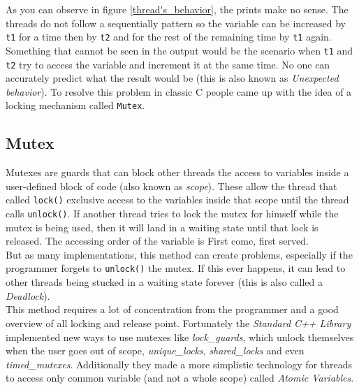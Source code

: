 As you can observe in figure \ref{thread's_behavior}, the prints make no sense. The threads do not follow a sequentially pattern so the variable can be increased by \texttt{t1} for a time then by \texttt{t2} and for the rest of the remaining time by \texttt{t1} again.\\
Something that cannot be seen in the output would be the scenario when \texttt{t1} and \texttt{t2} try to access the variable and increment it at the same time. No one can accurately predict what the result would be (this is also known as \textit{ Unexpected behavior}). To resolve this problem in classic C people came up with the idea of a locking mechanism called \texttt{Mutex}.\\
\subsection{Mutex}
Mutexes are guards that can block other threads the access to variables inside a user-defined block of code (also known as \textit{scope}). These allow the thread that called \texttt{lock()} exclusive access to the variables inside that scope until the thread calls \texttt{unlock()}\cite{concurrency}. If another thread tries to lock the mutex for himself while the mutex is being used, then it will land in a waiting state until that lock is released.  The accessing order of the variable is \dq First come, first served\dq{}.\\
But as many implementations, this method can create problems, especially if the programmer forgets to \texttt{unlock()} the mutex. If this ever happens, it can lead to other threads being stucked in a waiting state forever (this is also called a \textit{Deadlock})\cite{cppExpert}.\\
This method requires a lot of concentration from the programmer and a good overview of all locking and release point.
Fortunately the \textit{Standard C++ Library} implemented new ways to use mutexes like \textit{lock\_guards}, which unlock themselves when the user goes out of scope, \textit{unique\_locks}, \textit{shared\_locks} and even \textit{timed\_mutexes}. Additionally they made a more simplistic technology for threads to access only common variable (and not a whole scope) called \textit{Atomic Variables}.
